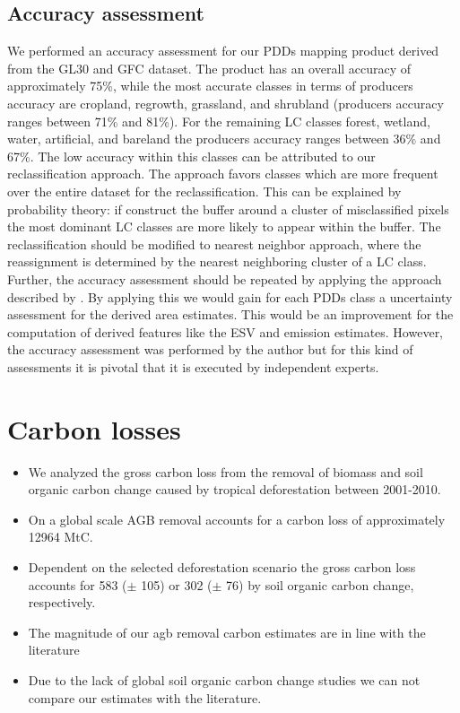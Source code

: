 		\subsection{Accuracy assessment}
		\label{subsec:discussion_accuracy_assessment}
			We performed an accuracy assessment for our \acp{PDD} mapping product derived from the \ac{GL30} and \ac{GFC} dataset. The product has an overall accuracy of approximately 75\%, while the most accurate classes in terms of producers accuracy are cropland, regrowth, grassland, and shrubland (producers accuracy ranges between 71\% and 81\%). For the remaining \ac{LC} classes forest, wetland, water, artificial, and bareland the producers accuracy ranges between 36\% and 67\%. The low accuracy within this classes can be attributed to our reclassification approach. The approach favors classes which are more frequent over the entire dataset for the reclassification. This can be explained by probability theory: if construct the buffer around a cluster of misclassified pixels the most dominant \ac{LC} classes are more likely to appear within the buffer. The reclassification should be modified to nearest neighbor approach, where the reassignment is determined by the nearest neighboring cluster of a \ac{LC} class. Further, the accuracy assessment should be repeated by applying the approach described by \citet{Olofsson2014}. By applying this we would gain for each \acp{PDD} class a uncertainty assessment for the derived area estimates. This would be an improvement for the computation of derived features like the \ac{ESV} and emission estimates. However, the accuracy assessment was performed by the author but for this kind of assessments it is pivotal that it is executed by independent experts.

	\section{Carbon losses}
		\begin{itemize}
			\item We analyzed the gross carbon loss from the removal of biomass and soil organic carbon change caused by tropical deforestation  between 2001-2010.
			\item On a global scale \ac{AGB} removal accounts for a carbon loss of approximately 12964 MtC.
			\item Dependent on the selected deforestation scenario the gross carbon loss accounts for 583 ($\pm$ 105) or 302 ($\pm$ 76) by soil organic carbon change, respectively.
			\item The magnitude of our agb removal carbon estimates are in line with the literature \citep{Achard2014,Sy2015}
			\item Due to the lack of global soil organic carbon change studies we can not compare our estimates with the literature.
		\end{itemize}

